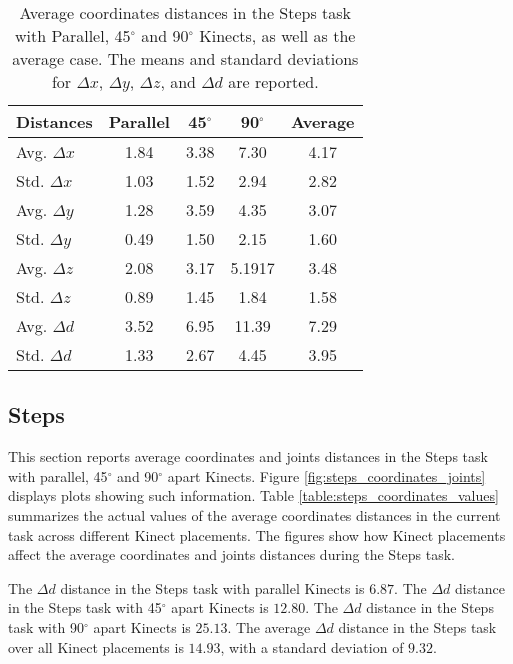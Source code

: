 % 
% 
\begin{table}[!htb]
\centering
  
  \begin{tabularx}{1.0\columnwidth}{||X c c c c||} 
   \hline
   \textbf{Distances} & \textbf{Parallel} & \textbf{45$^{\circ}$} & \textbf{90$^{\circ}$} & \textbf{Average} \\ [0.5ex] 
   \hline\hline
   Avg. $\Delta x$ & 1.84 & 3.38 & 7.30 & 4.17 \\
   \hline
   Std. $\Delta x$ & 1.03 & 1.52 & 2.94 & 2.82 \\
   \hline
   Avg. $\Delta y$ & 1.28 & 3.59 & 4.35 & 3.07 \\
   \hline
   Std. $\Delta y$ & 0.49 & 1.50 & 2.15 & 1.60 \\
   \hline
   Avg. $\Delta z$ & 2.08 & 3.17 & 5.1917 & 3.48 \\
   \hline
   Std. $\Delta z$ & 0.89 & 1.45 & 1.84 & 1.58 \\
   \hline
   Avg. $\Delta d$ & 3.52 & 6.95 & 11.39 & 7.29 \\
   \hline
   Std. $\Delta d$ & 1.33 & 2.67 & 4.45 & 3.95 \\
   \hline
  \end{tabularx}
  
  \caption{Average coordinates distances in the Steps task with Parallel, 45$^{\circ}$ and 90$^{\circ}$ Kinects, as well as the average case. The means and standard deviations for $\Delta x$, $\Delta y$, $\Delta z$, and $\Delta d$ are reported.}
  
  \label{table:stationary_coordinates_values}
\end{table}

% 
% 
\subsection{Steps}

This section reports average coordinates and joints distances in the Steps task with parallel, 45$^{\circ}$ and 90$^{\circ}$ apart Kinects. Figure \ref{fig:steps_coordinates_joints} displays plots showing such information. Table \ref{table:steps_coordinates_values} summarizes the actual values of the average coordinates distances in the current task across different Kinect placements. The figures show how Kinect placements affect the average coordinates and joints distances during the Steps task.

The $\Delta d$ distance in the Steps task with parallel Kinects is $6.87$. The $\Delta d$ distance in the Steps task with 45$^{\circ}$ apart Kinects is $12.80$. The $\Delta d$ distance in the Steps task with 90$^{\circ}$ apart Kinects is $25.13$. The average $\Delta d$ distance in the Steps task over all Kinect placements is $14.93$, with a standard deviation of $9.32$.

